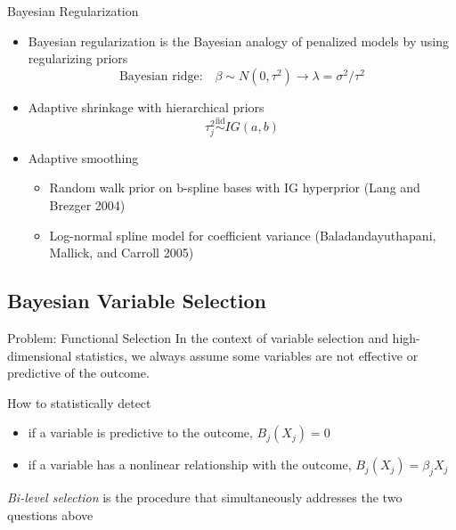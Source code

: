 \documentclass[
  ignorenonframetext,
  aspectratio=169]{beamer}
\providecommand{\tightlist}{%
  \setlength{\itemsep}{0pt}\setlength{\parskip}{0pt}}
\newcommand{\simiid}{\overset{\text{iid}}{\sim}}
\begin{document}
\begin{frame}{Bayesian Regularization}
\protect\hypertarget{bayesian-regularization-1}{}
\begin{itemize}
\tightlist
\item
  Bayesian regularization is the Bayesian analogy of penalized models by
  using regularizing priors \[
   \text{Bayesian ridge:} \quad \beta \sim N(0, \tau^2) \rightarrow  \lambda = \sigma^2/\tau^2
  \]
\item
  Adaptive shrinkage with hierarchical priors \[
   \tau^2_j \simiid IG(a, b)
  \]
\item
  Adaptive smoothing

  \begin{itemize}
  \tightlist
  \item
    Random walk prior on b-spline bases with IG hyperprior (Lang and
    Brezger 2004)
  \item
    Log-normal spline model for coefficient variance
    (Baladandayuthapani, Mallick, and Carroll 2005)
  \end{itemize}
\end{itemize}
\end{frame}

\hypertarget{bayesian-variable-selection}{%
\subsection{Bayesian Variable
Selection}\label{bayesian-variable-selection}}

\begin{frame}{Problem: Functional Selection}
\protect\hypertarget{problem-functional-selection}{}
In the context of variable selection and high-dimensional statistics, we
always assume some variables are not effective or predictive of the
outcome.

\begin{tcolorbox}[colback=green!5,colframe=green!40!black,title=Question]
How to statistically detect
  \begin{itemize}
    \item if a variable is predictive to the outcome, $B_j(X_j) = 0$
    \item if a variable has a nonlinear relationship with the outcome, $B_j(X_j) = \beta_j X_j$
  \end{itemize}
\end{tcolorbox}

\emph{Bi-level selection} is the procedure that simultaneously addresses
the two questions above
\end{frame}
\end{document}
